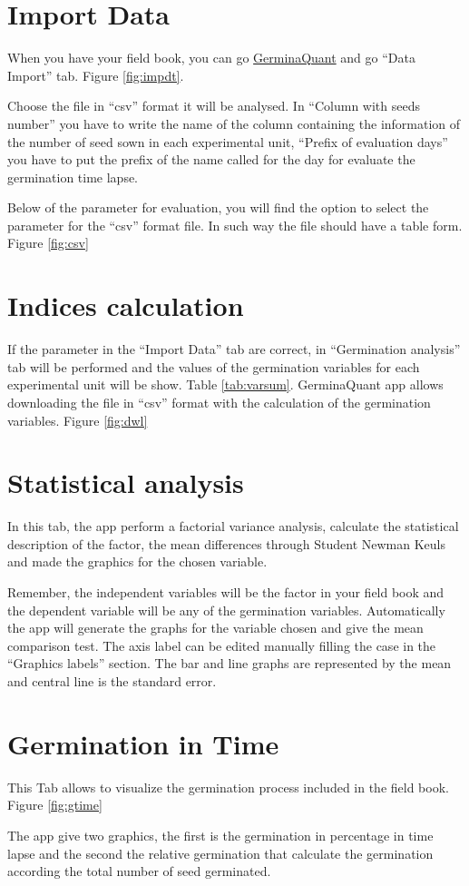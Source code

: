 \documentclass[]{book}
\begin{document}
\section{Import Data}\label{import-data}

When you have your field book, you can go
\href{https://flavjack.shinyapps.io/germinaquant/}{GerminaQuant} and go
``Data Import'' tab. Figure \ref{fig:impdt}.

Choose the file in ``csv'' format it will be analysed. In ``Column with
seeds number'' you have to write the name of the column containing the
information of the number of seed sown in each experimental unit,
``Prefix of evaluation days'' you have to put the prefix of the name
called for the day for evaluate the germination time lapse.

Below of the parameter for evaluation, you will find the option to
select the parameter for the ``csv'' format file. In such way the file
should have a table form. Figure \ref{fig:csv}

\section{Indices calculation}\label{indices-calculation}

If the parameter in the ``Import Data'' tab are correct, in
``Germination analysis'' tab will be performed and the values of the
germination variables for each experimental unit will be show. Table
\ref{tab:varsum}. GerminaQuant app allows downloading the file in
``csv'' format with the calculation of the germination variables. Figure
\ref{fig:dwl}

\section{Statistical analysis}\label{statistical-analysis}

In this tab, the app perform a factorial variance analysis, calculate
the statistical description of the factor, the mean differences through
Student Newman Keuls \citep{R-agricolae} and made the graphics
\citep{R-ggplot2} for the chosen variable.

Remember, the independent variables will be the factor in your field
book and the dependent variable will be any of the germination
variables. Automatically the app will generate the graphs for the
variable chosen and give the mean comparison test. The axis label can be
edited manually filling the case in the ``Graphics labels'' section. The
bar and line graphs are represented by the mean and central line is the
standard error.

\section{Germination in Time}\label{germination-in-time}

This Tab allows to visualize the germination process included in the
field book. Figure \ref{fig:gtime}

The app give two graphics, the first is the germination in percentage in
time lapse and the second the relative germination that calculate the
germination according the total number of seed germinated.


\end{document}
